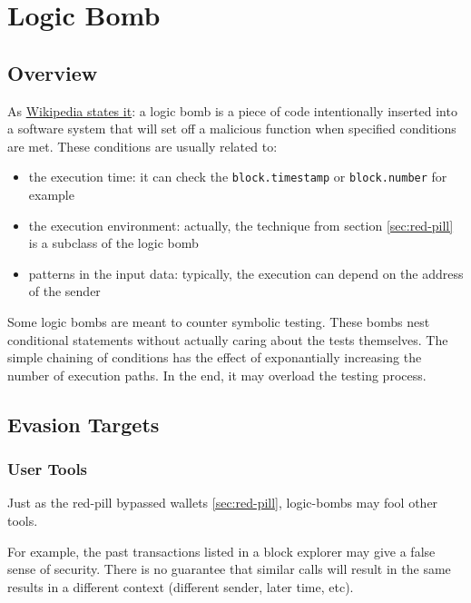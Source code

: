 \section{Logic Bomb} \label{sec:logic-bomb}

\subsection{Overview}

As \href{\urlarticlelogicbomb}{Wikipedia states it}: a logic bomb is a piece of code intentionally inserted into a software system that will set off a malicious function when specified conditions are met.
These conditions are usually related to:

\begin{itemize}
\item{the execution time: it can check the \lstinline[language=Solidity]{block.timestamp} or \lstinline[language=Solidity]{block.number} for example}
\item{the execution environment: actually, the technique from section \ref{sec:red-pill} is a subclass of the logic bomb}
\item{patterns in the input data: typically, the execution can depend on the address of the sender}
\end{itemize}

Some logic bombs are meant to counter symbolic testing.
These bombs nest conditional statements without actually caring about the tests themselves.
The simple chaining of conditions has the effect of exponantially increasing the number of execution paths.
In the end, it may overload the testing process.

\subsection{Evasion Targets}

\subsubsection{User Tools}

Just as the red-pill bypassed wallets \ref{sec:red-pill}, logic-bombs may fool other tools.

For example, the past transactions listed in a block explorer may give a false sense of security.
There is no guarantee that similar calls will result in the same results in a different context (different sender, later time, etc).

